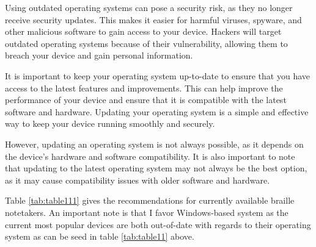Using outdated operating systems can pose a security risk, as they no longer receive security updates. This makes it easier for harmful viruses, spyware, and other malicious software to gain access to your device. Hackers will target outdated operating systems because of their vulnerability, allowing them to breach your device and gain personal information.

It is important to keep your operating system up-to-date to ensure that you have access to the latest features and improvements. This can help improve the performance of your device and ensure that it is compatible with the latest software and hardware. Updating your operating system is a simple and effective way to keep your device running smoothly and securely.

However, updating an operating system is not always possible, as it depends on the device’s hardware and software compatibility. It is also important to note that updating to the latest operating system may not always be the best option, as it may cause compatibility issues with older software and hardware.

Table \ref{tab:table111} gives the recommendations for currently available braille notetakers. An important note is that I favor Windows-based system as the current most popular devices are both out-of-date with regards to their operating system as can be seed in table \ref{tab:table11} above.

\pagebreak 
 
